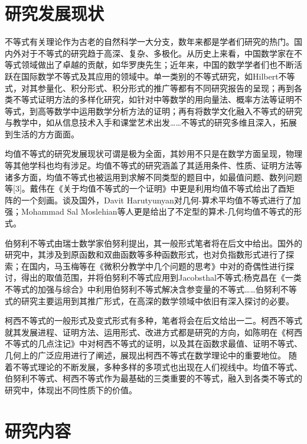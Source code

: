 \section{研究发展现状}

不等式有关理论作为古老的自然科学一大分支，数年来都是学者们研究的热门。国内外对于不等式的研究趋于高深、复杂、多极化。从历史上来看，中国数学家在不等式领域做出了卓越的贡献，如华罗庚先生；近年来，中国的数学学者们也不断活跃在国际数学不等式及其应用的领域中。单一类别的不等式研究，如Hilbert不等式，对其参量化、积分形式、积分形式的推广等都有不同研究报告的呈现；再到各类不等式证明方法的多样化研究，如针对中等数学的用向量法、概率方法等证明不等式，到高等数学中运用数学分析方法的证明；再有将数学文化融入不等式的研究与教学中，如从信息技术入手和课堂艺术出发……不等式的研究多维且深入，拓展到生活的方方面面。

均值不等式的研究发展现状可谓是极为全面，其妙用不只是在数学方面呈现，物理等其他学科也均有涉足。均值不等式的研究涵盖了其适用条件、性质、证明方法等诸多方面，均值不等式也被运用到求解不同类型的题目中，如最值问题、数列问题等[3]。戴伟在《关于均值不等式的一个证明》中更是利用均值不等式给出了酉矩阵的一个刻画\parencite{戴伟2020关于均值不等式的一个证明}。谈及国外，Davit Harutyunyan对几何-算术平均值不等式进行了加强\parencite{harutyunyan2018cauchy}；Mohammad Sal Moslehian等人更是给出了不定型的算术-几何均值不等式的形式\parencite{moslehian2021arithmetic}。

伯努利不等式由瑞士数学家伯努利提出，其一般形式笔者将在后文中给出。国外的研究中，其涉及到原函数和双曲函数等多种函数形式，也对负指数形式进行了探索；在国内，马玉梅等在《微积分教学中几个问题的思考》中对的奇偶性进行探讨，得出的取值范围，并将伯努利不等式应用到Jacobsthal不等式\parencite{马玉梅2020微积分教学中几个问题的思考};杨克昌在《一类不等式的加强与综合》中利用伯努利不等式解决含参变量的不等式\parencite{杨克昌1997一类不等式的加强与综合}……伯努利不等式的研究主要运用到其推广形式，在高深的数学领域中依旧有深入探讨的必要。

柯西不等式的一般形式及变式形式有多种，笔者将会在后文给出一二。柯西不等式就其发展进程、证明方法、运用形式、改进方式都是研究的方向，如陈明在《柯西不等式的几点注记》中对柯西不等式的证明，以及其在函数求最值、证明不等式、几何上的广泛应用进行了阐述，展现出柯西不等式在数学理论中的重要地位\parencite{陈明2018柯西不等式的几点注记}。
随着不等式理论的不断发展，多种多样的多项式也出现在人们视线中。均值不等式、伯努利不等式、柯西不等式作为最基础的三类重要的不等式，融入到各类不等式的研究中，体现出不同性质下的价值。



\section{研究内容}

